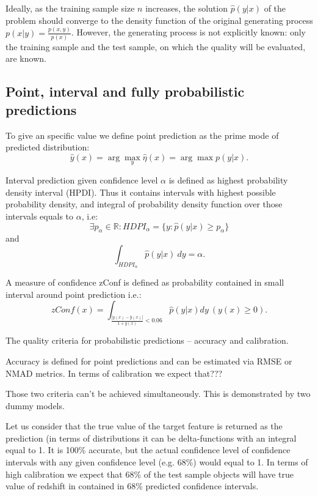 \documentclass[fleqn,usenatbib]{mnras}
\begin{document}
Ideally, as the training sample size \(n\) increases, the solution \(\hat{p}(y|x)\) of the problem should converge to the density function of the original generating process \(p(x|y) = \frac{p(x,y)}{p(x)}\). However, the generating process is not explicitly known: only the training sample and the test sample, on which the quality will be evaluated, are known.

\subsection{Point, interval and fully probabilistic predictions}
To give an specific value we define point prediction as the prime mode of predicted distribution:\begin{equation}\label{eq:point-estimate}
    \hat{y}(x) = \arg\max_y \hat{\eta}(x) = \arg\max p(y|x).
\end{equation}

Interval prediction given confidence level $\alpha$ is defined as highest probability density interval (HPDI). Thus it contains intervals with highest possible probability density, and integral of probability density function over those intervals equals to $\alpha$, i.e:
\begin{equation}\label{eq:hdpi_def}
    \exists p_\alpha \in \mathbb{R}: HDPI_{\alpha} = \{y : \hat{p}(y|x) \geq p_{\alpha}\}
\end{equation}
and
\begin{equation}
    \int_{HDPI_{\alpha}} \hat{p}(y|x) ~ dy = \alpha.
\end{equation}

A measure of confidence zConf is defined as probability contained in small interval around point prediction i.e.:\begin{equation}\label{eq:zconf}
    zConf(x) = \int_{\frac{|y(x) - \hat{y}(x)|}{1 + y(x)} < 0.06} \hat{p}(y|x)dy ~ (y(x) \geq 0).
\end{equation}

The quality criteria for probabilistic predictions -- accuracy and calibration.

Accuracy is defined for point predictions and can be estimated via RMSE or NMAD metrics. In terms of calibration we expect that???

Those two criteria can't be achieved simultaneously. This is demonstrated by two dummy models.

Let us consider that the true value of the target feature is returned as the prediction (in terms of distributions it can be delta-functions with an integral equal to 1. It is 100\% accurate, but the actual confidence level of confidence intervals with any given confidence level (e.g. 68\%) would equal to 1. In terms of high calibration we expect that 68\% of the test sample objects will have true value of redshift in contained in 68\% predicted confidence intervals.
\end{document}
